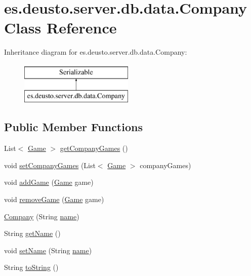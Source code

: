 \hypertarget{classes_1_1deusto_1_1server_1_1db_1_1data_1_1_company}{}\section{es.\+deusto.\+server.\+db.\+data.\+Company Class Reference}
\label{classes_1_1deusto_1_1server_1_1db_1_1data_1_1_company}
Inheritance diagram for es.\+deusto.\+server.\+db.\+data.\+Company\+:\begin{figure}[H]
\begin{center}
\leavevmode
\includegraphics[height=2.000000cm]{classes_1_1deusto_1_1server_1_1db_1_1data_1_1_company}
\end{center}
\end{figure}
\subsection*{Public Member Functions}
\begin{DoxyCompactItemize}
\item 
List$<$ \hyperlink{classes_1_1deusto_1_1server_1_1db_1_1data_1_1_game}{Game} $>$ \hyperlink{classes_1_1deusto_1_1server_1_1db_1_1data_1_1_company_a1ad7cdb23ac8ff8961f8604aedbd3cbb}{get\+Company\+Games} ()
\item 
void \hyperlink{classes_1_1deusto_1_1server_1_1db_1_1data_1_1_company_a65c32a8345ba3f82ca96809d5903f544}{set\+Company\+Games} (List$<$ \hyperlink{classes_1_1deusto_1_1server_1_1db_1_1data_1_1_game}{Game} $>$ company\+Games)
\item 
void \hyperlink{classes_1_1deusto_1_1server_1_1db_1_1data_1_1_company_a99f3f91509e0a1ff5fc4d4d6a6219e77}{add\+Game} (\hyperlink{classes_1_1deusto_1_1server_1_1db_1_1data_1_1_game}{Game} game)
\item 
void \hyperlink{classes_1_1deusto_1_1server_1_1db_1_1data_1_1_company_a75e3ecef97f34aab1511b7294c65bcf5}{remove\+Game} (\hyperlink{classes_1_1deusto_1_1server_1_1db_1_1data_1_1_game}{Game} game)
\item 
\hyperlink{classes_1_1deusto_1_1server_1_1db_1_1data_1_1_company_acdee89103d4e157b7d4016fd8cd26d5e}{Company} (String \hyperlink{classes_1_1deusto_1_1server_1_1db_1_1data_1_1_company_a3080458c34b5cf83c7f8e866a93e60ac}{name})
\item 
String \hyperlink{classes_1_1deusto_1_1server_1_1db_1_1data_1_1_company_a3bf0781fd4ec441406a5f8a05f293a23}{get\+Name} ()
\item 
void \hyperlink{classes_1_1deusto_1_1server_1_1db_1_1data_1_1_company_ab33e41d6c5ac9f87ffc7a7b3d73e1f4a}{set\+Name} (String \hyperlink{classes_1_1deusto_1_1server_1_1db_1_1data_1_1_company_a3080458c34b5cf83c7f8e866a93e60ac}{name})
\item 
String \hyperlink{classes_1_1deusto_1_1server_1_1db_1_1data_1_1_company_a3896b4f463ebed4f07fd3d9d0639b75a}{to\+String} ()
\end{DoxyCompactItemize}
